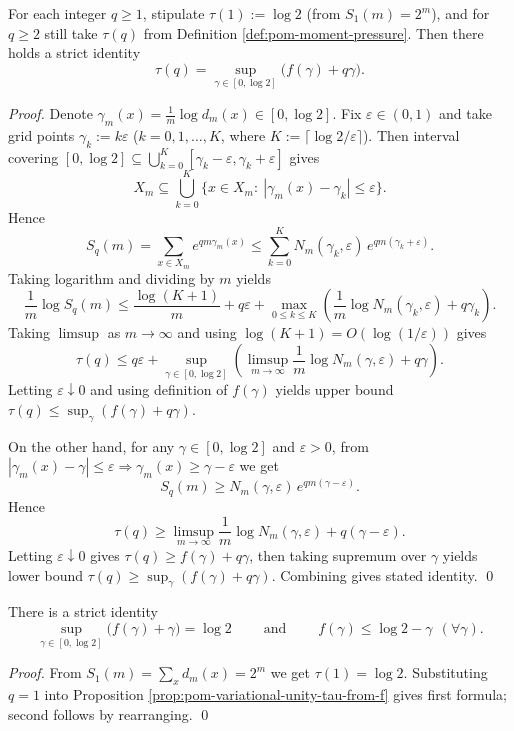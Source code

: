 \begin{proposition}[Variational unification formula: \texorpdfstring{$\tau(q)=\sup_\gamma(f(\gamma)+q\gamma)$}{tau(q)=sup(f+qg)}]\label{prop:pom-variational-unity-tau-from-f}
For each integer \(q\ge 1\), stipulate \(\tau(1):=\log 2\) (from \(S_1(m)=2^m\)), and for \(q\ge 2\) still take \(\tau(q)\) from Definition \ref{def:pom-moment-pressure}.
Then there holds a strict identity
\[
\boxed{\;
\tau(q)=\sup_{\gamma\in[0,\log 2]}\bigl(f(\gamma)+q\gamma\bigr).\;}
\]
\end{proposition}
\begin{proof}
Denote \(\gamma_m(x)=\frac1m\log d_m(x)\in[0,\log 2]\).
Fix \(\varepsilon\in(0,1)\) and take grid points \(\gamma_k:=k\varepsilon\) (\(k=0,1,\dots,K\), where \(K:=\lceil \log 2/\varepsilon\rceil\)).
Then interval covering \([0,\log 2]\subseteq\bigcup_{k=0}^{K}[\gamma_k-\varepsilon,\gamma_k+\varepsilon]\) gives
\[
X_m\subseteq \bigcup_{k=0}^{K}\{x\in X_m:\ |\gamma_m(x)-\gamma_k|\le \varepsilon\}.
\]
Hence
\[
S_q(m)=\sum_{x\in X_m}e^{qm\gamma_m(x)}
\le
\sum_{k=0}^{K}N_m(\gamma_k,\varepsilon)\,e^{qm(\gamma_k+\varepsilon)}.
\]
Taking logarithm and dividing by \(m\) yields
\[
\frac1m\log S_q(m)
\le
\frac{\log(K+1)}{m}+q\varepsilon+\max_{0\le k\le K}\left(\frac1m\log N_m(\gamma_k,\varepsilon)+q\gamma_k\right).
\]
Taking \(\limsup\) as \(m\to\infty\) and using \(\log(K+1)=O(\log(1/\varepsilon))\) gives
\[
\tau(q)\le q\varepsilon+\sup_{\gamma\in[0,\log 2]}\left(\limsup_{m\to\infty}\frac1m\log N_m(\gamma,\varepsilon)+q\gamma\right).
\]
Letting \(\varepsilon\downarrow 0\) and using definition of \(f(\gamma)\) yields upper bound
\(\tau(q)\le \sup_{\gamma}(f(\gamma)+q\gamma)\).
\par
On the other hand, for any \(\gamma\in[0,\log 2]\) and \(\varepsilon>0\), from \(|\gamma_m(x)-\gamma|\le\varepsilon\Rightarrow \gamma_m(x)\ge \gamma-\varepsilon\) we get
\[
S_q(m)\ge N_m(\gamma,\varepsilon)\,e^{qm(\gamma-\varepsilon)}.
\]
Hence
\[
\tau(q)\ge \limsup_{m\to\infty}\frac1m\log N_m(\gamma,\varepsilon)+q(\gamma-\varepsilon).
\]
Letting \(\varepsilon\downarrow 0\) gives \(\tau(q)\ge f(\gamma)+q\gamma\), then taking supremum over \(\gamma\) yields lower bound
\(\tau(q)\ge \sup_\gamma(f(\gamma)+q\gamma)\).
Combining gives stated identity. \qed
\end{proof}

\begin{corollary}[Holographic conservation law: \texorpdfstring{$\log 2=\sup_\gamma(f(\gamma)+\gamma)$}{log2=sup(f+g)}]\label{cor:pom-holographic-conservation-f-plus-gamma}
There is a strict identity
\[
\boxed{\;\sup_{\gamma\in[0,\log 2]}\bigl(f(\gamma)+\gamma\bigr)=\log 2\;}
\qquad\text{and}\qquad
\boxed{\;f(\gamma)\le \log 2-\gamma\ \ (\forall\gamma).\;}
\]
\end{corollary}
\begin{proof}
From \(S_1(m)=\sum_x d_m(x)=2^m\) we get \(\tau(1)=\log 2\).
Substituting \(q=1\) into Proposition \ref{prop:pom-variational-unity-tau-from-f} gives first formula; second follows by rearranging. \qed
\end{proof}

